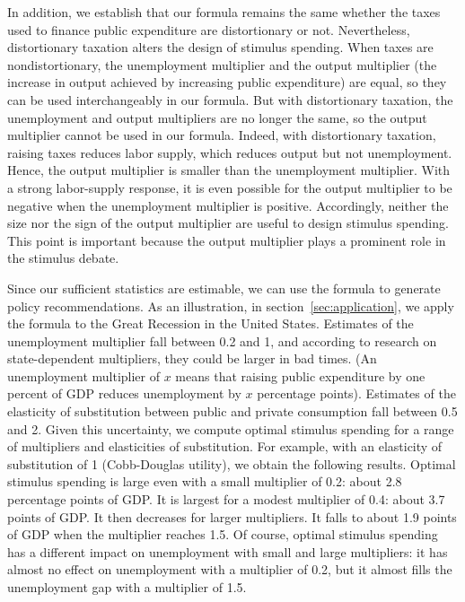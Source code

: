 \documentclass[letterpaper,12pt,leqno]{article}
\begin{document}
\begin{bibunit}
In addition, we establish that our formula remains the same whether the taxes used to finance public expenditure are distortionary or not. Nevertheless, distortionary taxation alters the design of stimulus spending. When taxes are nondistortionary, the unemployment multiplier and the output multiplier (the increase in output achieved by increasing public expenditure) are equal, so they can be used interchangeably in our formula. But with distortionary taxation, the unemployment and output multipliers are no longer the same, so the output multiplier cannot be used in our formula. Indeed, with distortionary taxation, raising taxes reduces labor supply, which reduces output but not unemployment. Hence, the output multiplier is smaller than the unemployment multiplier. With a strong labor-supply response, it is even possible for the output multiplier to be negative when the unemployment multiplier is positive. Accordingly, neither the size nor the sign of the output multiplier are useful to design stimulus spending. This point is important because the output multiplier plays a prominent role in the stimulus debate.

 Since our sufficient statistics are estimable, we can use the formula to generate policy recommendations. As an illustration, in section~\ref{sec:application}, we apply the formula to the Great Recession in the United States. Estimates of the unemployment multiplier fall between 0.2 and 1, and according to research on state-dependent multipliers, they could be larger in bad times. (An unemployment multiplier of $x$ means that raising public expenditure by one percent of GDP reduces unemployment by $x$ percentage points). Estimates of the elasticity of substitution between public and private consumption fall between 0.5 and 2. Given this uncertainty, we compute optimal stimulus spending for a range of multipliers and elasticities of substitution. For example, with an elasticity of substitution of 1 (Cobb-Douglas utility), we obtain the following results. Optimal stimulus spending is large even with a small multiplier of 0.2: about 2.8 percentage points of GDP. It is largest for a modest multiplier of 0.4: about 3.7 points of GDP. It then decreases for larger multipliers. It falls to about 1.9 points of GDP when the multiplier reaches 1.5. Of course, optimal stimulus spending has a different impact on unemployment with small and large multipliers: it has almost no effect on unemployment with a multiplier of 0.2, but it almost fills the unemployment gap with a multiplier of 1.5.


\end{bibunit}
\end{document}
